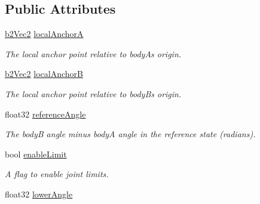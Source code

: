 \subsection*{Public Attributes}
\begin{DoxyCompactItemize}
\item 
\hyperlink{structb2_vec2}{b2\+Vec2} \hyperlink{structb2_revolute_joint_def_a76337d07aa63232a7b20d50decc862ae}{local\+AnchorA}\hypertarget{structb2_revolute_joint_def_a76337d07aa63232a7b20d50decc862ae}{}\label{structb2_revolute_joint_def_a76337d07aa63232a7b20d50decc862ae}

\begin{DoxyCompactList}\small\item\em The local anchor point relative to bodyA\textquotesingle{}s origin. \end{DoxyCompactList}\item 
\hyperlink{structb2_vec2}{b2\+Vec2} \hyperlink{structb2_revolute_joint_def_a3f33bc1d9f6c22043a5ff2f1d89f04e0}{local\+AnchorB}\hypertarget{structb2_revolute_joint_def_a3f33bc1d9f6c22043a5ff2f1d89f04e0}{}\label{structb2_revolute_joint_def_a3f33bc1d9f6c22043a5ff2f1d89f04e0}

\begin{DoxyCompactList}\small\item\em The local anchor point relative to bodyB\textquotesingle{}s origin. \end{DoxyCompactList}\item 
float32 \hyperlink{structb2_revolute_joint_def_a1858d897d5fea04c5e606a1ff73f64f8}{reference\+Angle}\hypertarget{structb2_revolute_joint_def_a1858d897d5fea04c5e606a1ff73f64f8}{}\label{structb2_revolute_joint_def_a1858d897d5fea04c5e606a1ff73f64f8}

\begin{DoxyCompactList}\small\item\em The bodyB angle minus bodyA angle in the reference state (radians). \end{DoxyCompactList}\item 
bool \hyperlink{structb2_revolute_joint_def_a2eaefc5fc5caf879cfd59ebcd852b756}{enable\+Limit}\hypertarget{structb2_revolute_joint_def_a2eaefc5fc5caf879cfd59ebcd852b756}{}\label{structb2_revolute_joint_def_a2eaefc5fc5caf879cfd59ebcd852b756}

\begin{DoxyCompactList}\small\item\em A flag to enable joint limits. \end{DoxyCompactList}\item 
float32 \hyperlink{structb2_revolute_joint_def_a24d0b2638a01405c77bd1c0de3e53de8}{lower\+Angle}\hypertarget{structb2_revolute_joint_def_a24d0b2638a01405c77bd1c0de3e53de8}{}\label{structb2_revolute_joint_def_a24d0b2638a01405c77bd1c0de3e53de8}


\end{DoxyCompactItemize}
